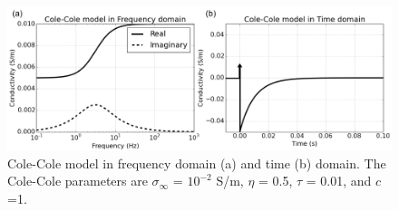 \documentclass[letterpaper,11pt]{article}
\newcommand{\siginf}{\sigma_\infty}
\begin{document}
\begin{figure}
  \includegraphics[width=1.0\textwidth]{figures/FDandTDCole.png}
  \caption{Cole-Cole model in frequency domain (a) and time (b) domain. The Cole-Cole parameters are $\siginf$ = $10^{-2}$ S/m, $\eta $ = 0.5, $\tau$ = 0.01, and $c$=1.}
  \label{Fig:FDandTDCole}
\end{figure}

\end{document}
